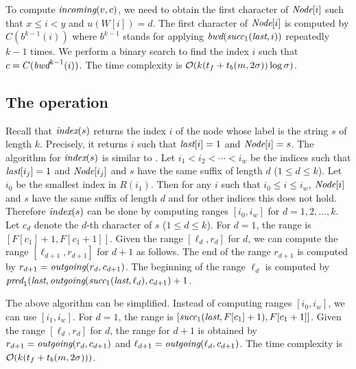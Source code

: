 To compute ${\textit{incoming}}(v,c)$, we need to obtain the first character of ${\textit{Node}}[i]$
such that $x \le i < y$ and $u(W[i]) = d$.  The first character of ${\textit{Node}}[i]$
is computed by $C(b^{k-1}(i))$ where $b^{k-1}$ stands for applying
${\textit{bwd}}({\textit{succ}}_1({\textit{last}},i))$ repeatedly $k-1$ times.  
We perform a binary search to
find the index $i$ such that $c = C({\textit{bwd}}^{k-1}(i))$.
The time complexity is 
$\mathcal{O}(k(t_f + t_b(m,2\sigma))\log\sigma)$.

\subsection{The {\search} operation}
Recall that ${\textit{index}}(s)$ returns the index $i$ of the node whose label 
is the string $s$ of length $k$.
Precisely, it returns $i$ such that ${\textit{last}}[i] = 1$ and ${\textit{Node}}[i] = s$.
The algorithm for ${\textit{index}}(s)$ is similar to \cite{FM05}.
Let $i_1 < i_2 < \cdots < i_w$ be the indices such that
${\textit{last}}[i_j] = 1$ and ${\textit{Node}}[i_j]$ and $s$ have the same suffix of length $d$ ($1 \le d \le k$).
Let $i_0$ be the smallest index in $R(i_1)$.
Then for any $i$ such that $i_0 \le i \le i_w$, ${\textit{Node}}[i]$ and $s$ have the same suffix of length $d$
and for other indices this does not hold.
Therefore ${\textit{index}}(s)$ can be done by computing 
ranges $[i_0, i_w]$ for $d = 1,2,\ldots,k$.
Let $c_d$ denote the $d$-th character of $s$ ($1 \le d \le k$).
For $d=1$, the range is $[F[c_1]+1, F[c_1+1]]$.
Given the range $[\ell_d, r_d]$ for $d$,  we can compute the range $[\ell_{d+1}, r_{d+1}]$ for $d+1$
as follows.  The end of the range $r_{d+1}$ is computed by $r_{d+1} = {\textit{outgoing}}(r_d, c_{d+1})$.
The beginning of the range $\ell_d$ is computed by ${\textit{pred}}_1({\textit{last}},{\textit{outgoing}}({\textit{succ}}_1({\textit{last}}, \ell_d), c_{d+1})+1$.

The above algorithm can be simplified.  Instead of computing ranges $[i_0, i_w]$,
we can use $[i_1, i_w]$.  For $d=1$, the range is $[{\textit{succ}}_1({\textit{last}},F[c_1]+1), F[c_1+1]]$.
Given the range $[\ell_d, r_d]$ for $d$, the range for $d+1$ is obtained by
$r_{d+1} = {\textit{outgoing}}(r_d, c_{d+1})$ and $\ell_{d+1} = {\textit{outgoing}}(\ell_d, c_{d+1})$.
The time complexity is $\mathcal{O}(k(t_f + t_b(m,2\sigma)))$.

